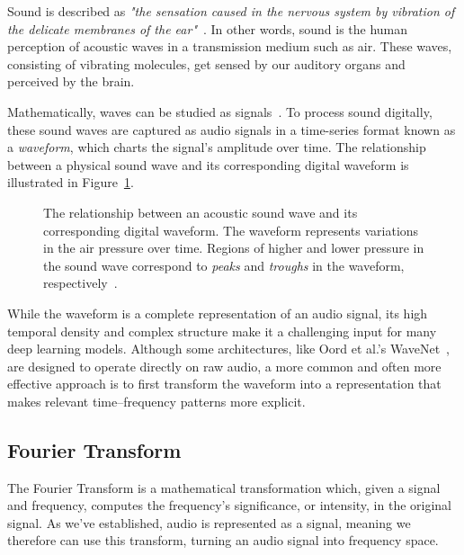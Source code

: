 Sound is described as \textit{"the sensation caused in the nervous system by vibration of the delicate membranes of the ear"}~\cite{1953fundamentals}. In other words, sound is the human perception of acoustic waves in a transmission medium such as air. These waves, consisting of vibrating molecules, get sensed by our auditory organs and perceived by the brain. 

Mathematically, waves can be studied as signals~\cite{8454362}. To process sound digitally, these sound waves are captured as audio signals in a time-series format known as a \textit{waveform}, which charts the signal's amplitude over time. The relationship between a physical sound wave and its corresponding digital waveform is illustrated in Figure~\ref{WaveformFigure}.

\begin{figure}[H]
    \centering
    
    \caption{The relationship between an acoustic sound wave and its corresponding digital waveform. The waveform represents variations in the air pressure over time. Regions of higher and lower pressure in the sound wave correspond to \textit{peaks} and \textit{troughs} in the waveform, respectively~\cite{svantek2025}.}
    \label{WaveformFigure}
\end{figure}

While the waveform is a complete representation of an audio signal, its high temporal density and complex structure make it a challenging input for many deep learning models. Although some architectures, like Oord et al.'s WaveNet~\cite{oord2016wavenetgenerativemodelraw}, are designed to operate directly on raw audio, a more common and often more effective approach is to first transform the waveform into a representation that makes relevant time–frequency patterns more explicit.

\subsection{Fourier Transform}

The Fourier Transform is a mathematical transformation which, given a signal and frequency, computes the frequency's significance, or intensity, in the original signal. As we've established, audio is represented as a signal, meaning we therefore can use this transform, turning an audio signal into frequency space. 

